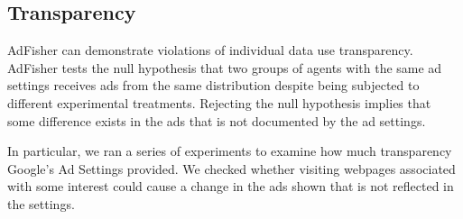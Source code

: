 \documentclass{article}
\begin{document}
\subsection{Transparency}
\label{sec:subs}

AdFisher can demonstrate violations of individual data use transparency. 
AdFisher tests the null hypothesis that two groups of agents with the same ad settings receives ads from the same distribution despite being subjected to different experimental treatments.
Rejecting the null hypothesis implies that some difference exists in the ads that is not documented by the ad settings.


In particular, we ran a series of experiments to examine how much transparency Google's Ad Settings provided.  We checked whether visiting webpages associated with some interest could cause a change in the ads shown that is not reflected in the settings.
\end{document}

